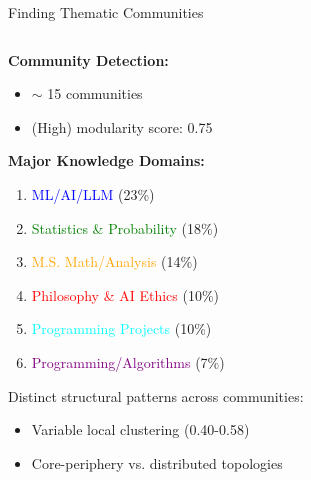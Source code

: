 \documentclass[nodes]{beamer}
\begin{document}
\begin{frame}{Finding Thematic Communities}
  \begin{columns}[T]
    \begin{column}{0.38\textwidth}
      \small
      \textbf{Community Detection:}
      \begin{itemize}
        \item $\sim$ 15 communities
        \item \scriptsize (High) modularity score: 0.75
      \end{itemize}
      \vspace{0.1cm}
      \textbf{Major Knowledge Domains:}
      \scriptsize
      \begin{enumerate}
          \item \textcolor{blue}{ML/AI/LLM} \tiny(23\%)
          \item \textcolor{green}{Statistics \& Probability} \tiny(18\%) 
          \item \textcolor{orange}{M.S. Math/Analysis} \tiny(14\%)
          \item \textcolor{red}{Philosophy \& AI Ethics} \tiny(10\%)
          \item \textcolor{cyan}{Programming Projects} \tiny(10\%)
          \item \textcolor{purple}{Programming/Algorithms} \tiny(7\%)
      \end{enumerate}
      \vspace{0.1cm}
      \small
      Distinct structural patterns across communities:
      \begin{itemize}
        \item \scriptsize Variable local clustering (0.40-0.58)
        \item \scriptsize Core-periphery vs. distributed topologies
      \end{itemize}
    \end{column}
    \begin{column}{0.62\textwidth}

\end{column}
\end{columns}
\end{frame}
\end{document}
